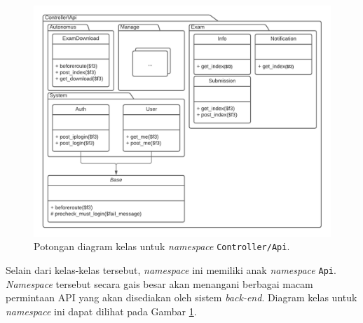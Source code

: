     \begin{figure}
        \centering
        \includegraphics[width=0.75\paperwidth]{Gambar/classmap-be/Classmap - app-controller-api.pdf}
        \caption{Potongan diagram kelas untuk \textit{namespace}
        \texttt{Controller/Api}.}
        \label{fig:classmap_app-controller-api}
    \end{figure}
    
    Selain dari kelas-kelas tersebut, \textit{namespace} ini memiliki anak
    \textit{namespace} \texttt{Api}. \textit{Namespace} tersebut secara gais
    besar akan menangani berbagai macam permintaan API yang akan disediakan oleh
    sistem \textit{back-end}. Diagram kelas untuk \textit{namespace} ini dapat
    dilihat pada Gambar \ref{fig:classmap_app-controller-api}.
    
